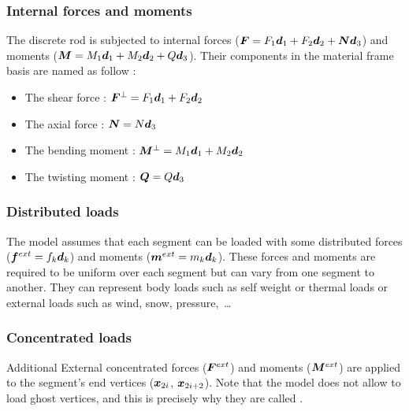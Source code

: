  \subsubsection{Internal forces and moments}
The discrete rod is subjected to internal forces ($\boldsymbol{F} = F_1 \boldsymbol{d}_1 + F_2 \boldsymbol{d}_2 + \boldsymbol{N}\boldsymbol{d}_3$) and moments ($\boldsymbol{M} = M_1 \boldsymbol{d}_1 + M_2 \boldsymbol{d}_2 + Q\boldsymbol{d}_3$). Their components in the material frame basis are named as follow :
\begin{itemize}
\item The shear force : $\boldsymbol{F}^{\perp} = F_1 \boldsymbol{d}_1 + F_2 \boldsymbol{d}_2$ 
\item The axial force : $\boldsymbol{N} = N \boldsymbol{d}_3$
\item The bending moment : $\boldsymbol{M}^{\perp} = M_1 \boldsymbol{d}_1 + M_2 \boldsymbol{d}_2$ 
\item The twisting moment : $\boldsymbol{Q} = Q \boldsymbol{d}_3$ 
\end{itemize}

\subsubsection{Distributed loads}
The model assumes that each segment can be loaded with some distributed forces ($\boldsymbol{f}^{ext} = f_k\boldsymbol{d}_k$) and moments ($\boldsymbol{m}^{ext} = m_k\boldsymbol{d}_k$). These forces and moments are required to be uniform over each segment but can vary from one segment to another. They can represent body loads such as self weight or thermal loads or external loads such as wind, snow, pressure,~\dots

\subsubsection{Concentrated loads}
Additional External concentrated forces ($\boldsymbol{F}^{ext}$) and moments ($\boldsymbol{M}^{ext}$) are applied to the segment's end vertices ($\boldsymbol{x}_{2i}$,  $\boldsymbol{x}_{2i+2}$). Note that the model does not allow to load ghost vertices, and this is precisely why they are called .

